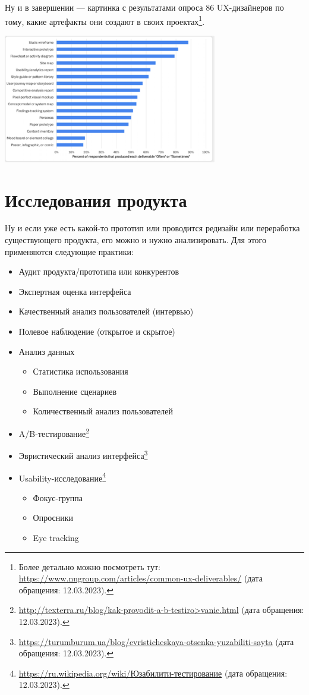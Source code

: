 \documentclass{../../text-style}
\begin{document}
Ну и в завершении --- картинка с результатами опроса 86 UX-дизайнеров по тому, какие артефакты они создают в своих проектах\footnote{Более детально можно посмотреть тут: \url{https://www.nngroup.com/articles/common-ux-deliverables/} (дата обращения: 12.03.2023).}.

\begin{center}
    \includegraphics[width=0.7\textwidth]{statistics.png}
\end{center}

\section{Исследования продукта}

Ну и если уже есть какой-то прототип или проводится редизайн или переработка существующего продукта, его можно и нужно анализировать. Для этого применяются следующие практики:

\begin{itemize}
    \item Аудит продукта/прототипа или конкурентов
    \item Экспертная оценка интерфейса
    \item Качественный анализ пользователей (интервью)
    \item Полевое наблюдение (открытое и скрытое)
    \item Анализ данных
    \begin{itemize}
        \item Статистика использования
        \item Выполнение сценариев
        \item Количественный анализ пользователей
    \end{itemize}
    \item A/B-тестирование\footnote{\url{http://texterra.ru/blog/kak-provodit-a-b-testiro>vanie.html} (дата обращения: 12.03.2023).}
    \item Эвристический анализ интерфейса\footnote{\url{https://turumburum.ua/blog/evristicheskaya-otsenka-yuzabiliti-sayta} (дата обращения: 12.03.2023).}
    \item Usability-исследование\footnote{\url{https://ru.wikipedia.org/wiki/Юзабилити-тестирование} (дата обращения: 12.03.2023).}
    \begin{itemize}
        \item Фокус-группа
        \item Опросники
        \item Eye tracking
    \end{itemize}
\end{itemize}
\end{document}
